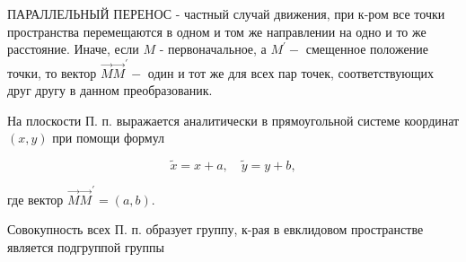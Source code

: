 \documentclass[10pt]{article}
\begin{document}
ПАРАЛЛЕЛЬНЫЙ ПЕРЕНОС - частный случай движения, при к-ром все точки пространства перемещаются в одном и том же направлении на одно и то же расстояние. Иначе, если $M$ - первоначальное, а $M^{\prime}-$ смещенное положение точки, то вектор $\vec{M} \vec{M}^{\prime}-$ один и тот же для всех пар точек, соответствующих друг другу в данном преобразованик.



На плоскости П. п. выражается аналитически в прямоугольной системе координат $(x, y)$ при помощи формул



\[

\tilde{x}=x+a, \quad \tilde{y}=y+b,

\]



где вектор $\vec{M} \vec{M}^{\prime}=(a, b)$.



Совокупность всех П. п. образует группу, к-рая в евклидовом пространстве является подгруппой группы
\end{document}
